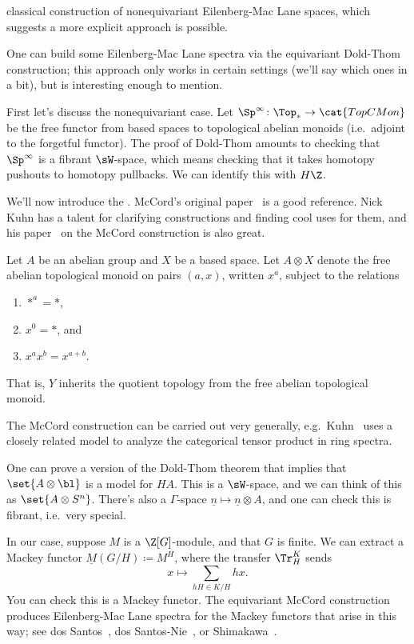 classical construction of nonequivariant Eilenberg-Mac Lane spaces, which suggests a more explicit approach is
possible.
\begin{cons}
\label{EMcons}
One can build some Eilenberg-Mac Lane spectra via the equivariant Dold-Thom construction; this approach only works
in certain settings (we'll say which ones in a bit), but is interesting enough to mention.

First let's discuss the nonequivariant case. Let $\Sp^\infty\colon\Top_*\to\cat{TopCMon}$ be the free functor from
based spaces to topological abelian monoids (i.e.\ adjoint to the forgetful functor). The proof of Dold-Thom
amounts to checking that $\Sp^\infty$ is a fibrant $\sW$-space, which means checking that it takes homotopy
pushouts to homotopy pullbacks. We can identify this with $H\Z$.

We'll now introduce the . McCord's original paper~\cite{McCord} is a good reference. Nick
Kuhn has a talent for clarifying constructions and finding cool uses for them, and his paper~\cite{KuhnMcCord} on
the McCord construction is also great.

Let $A$ be an abelian group and $X$ be a based space. Let $A\otimes X$ denote the free abelian topological monoid
on pairs $(a,x)$, written $x^a$, subject to the relations
\begin{enumerate}
	\item $*^a = *$,
	\item $x^0 = *$, and
	\item $x^ax^b = x^{a+b}$.
\end{enumerate}
That is, $Y$ inherits the quotient topology from the free abelian topological monoid.
\begin{rem}
The McCord construction can be carried out very generally, e.g.\ Kuhn~\cite{KuhnMcCord} uses a closely related
model to analyze the categorical tensor product in ring spectra.
\end{rem}
One can prove a version of the Dold-Thom theorem that implies that $\set{A\otimes\bl}$ is a model for $HA$. This is
a $\sW$-space, and we can think of this as $\set{A\otimes S^n}$. There's also a $\Gamma$-space $\underline n\mapsto
\underline n\otimes A$, and one can check this is fibrant, i.e.\ very special.

In our case, suppose $M$ is a $\Z[G]$-module, and that $G$ is finite. We can extract a Mackey functor $\underline
M(G/H)\coloneqq M^H$, where the transfer $\Tr_H^K$ sends
\[x\mapsto \sum_{hH\in K/H} hx.\]
You can check this is a Mackey functor. The equivariant McCord construction produces Eilenberg-Mac Lane spectra for
the Mackey functors that arise in this way; see dos Santos~\cite{dosSantos}, dos Santos-Nie~\cite{dSN09}, or
Shimakawa~\cite{Shi89}.


\end{cons}
